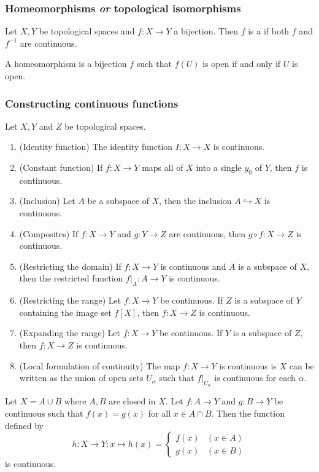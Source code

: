 \subsubsection{Homeomorphisms \textit{or} topological isomorphisms}
\begin{definition}
Let $X,Y$ be topological spaces and $f:X\to Y$ a bijection. Then $f$ is a  if both $f$ and $f^{-1}$ are continuous.
\end{definition}
\begin{lemma}
A homeomorphism is a bijection $f$ such that $f(U)$ is open \textup{if and only if} $U$ is open.
\end{lemma}
\subsubsection{Constructing continuous functions}
\begin{proposition} \label{continuousConstructions}
Let $X,Y$ and $Z$ be topological spaces.
\begin{enumerate}
\item \textup{(Identity function)} The identity function $I:X\to X$ is continuous.
\item \textup{(Constant function)} If $f:X\to Y$ maps all of $X$ into a single $y_0$ of $Y$, then $f$ is continuous.
\item \textup{(Inclusion)} Let $A$ be a subspace of $X$, then the inclusion $A\hookrightarrow X$ is continuous.
\item \textup{(Composites)} If $f:X\to Y$ and $g:Y\to Z$ are continuous, then $g\circ f: X\to Z$ is continuous.
\item \textup{(Restricting the domain)} If $f:X\to Y$ is continuous and $A$ is a subspace of $X$, then the restricted function $f|_{A}:A\to Y$ is continuous.
\item \textup{(Restricting the range)} Let $f:X\to Y$ be continuous. If $Z$ is a subspace of $Y$ containing the image set $f[X]$, then $f:X\to Z$ is continuous.
\item \textup{(Expanding the range)} Let $f:X\to Y$ be continuous. If $Y$ is a subspace of $Z$, then $f:X\to Z$ is continuous.
\item \textup{(Local formulation of continuity)} The map $f:X\to Y$ is continuous is $X$ can be written as the union of open sets $U_\alpha$ such that $f|_{U_\alpha}$ is continuous for each $\alpha$.
\end{enumerate}
\end{proposition}
\begin{proposition}
Let $X=A\cup B$ where $A,B$ are closed in $X$. Let $f:A\to Y$ and $g:B\to Y$ be continuous such that $f(x)=g(x)$ for all $x\in A\cap B$. Then the function defined by
\[ h: X\to Y: x\mapsto h(x) = \begin{cases}
f(x) & (x\in A) \\ g(x) & (x\in B)
\end{cases} \]
is continuous.
\end{proposition}
